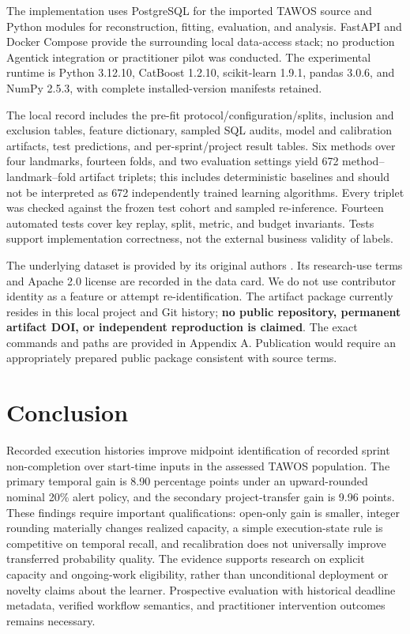 \documentclass[11pt,a4paper]{article}
\begin{document}
The implementation uses PostgreSQL for the imported TAWOS source and Python modules for reconstruction, fitting, evaluation, and analysis. FastAPI and Docker Compose provide the surrounding local data-access stack; no production Agentick integration or practitioner pilot was conducted. The experimental runtime is Python 3.12.10, CatBoost 1.2.10, scikit-learn 1.9.1, pandas 3.0.6, and NumPy 2.5.3, with complete installed-version manifests retained.

The local record includes the pre-fit protocol/configuration/splits, inclusion and exclusion tables, feature dictionary, sampled SQL audits, model and calibration artifacts, test predictions, and per-sprint/project result tables. Six methods over four landmarks, fourteen folds, and two evaluation settings yield 672 method--landmark--fold artifact triplets; this includes deterministic baselines and should not be interpreted as 672 independently trained learning algorithms. Every triplet was checked against the frozen test cohort and sampled re-inference. Fourteen automated tests cover key replay, split, metric, and budget invariants. Tests support implementation correctness, not the external business validity of labels.

The underlying dataset is provided by its original authors \cite{tawosi2022tawos,tawosv11}. Its research-use terms and Apache 2.0 license are recorded in the data card. We do not use contributor identity as a feature or attempt re-identification. The artifact package currently resides in this local project and Git history; \textbf{no public repository, permanent artifact DOI, or independent reproduction is claimed}. The exact commands and paths are provided in Appendix A. Publication would require an appropriately prepared public package consistent with source terms.

\section{Conclusion}\label{conclusion}

Recorded execution histories improve midpoint identification of recorded sprint non-completion over start-time inputs in the assessed TAWOS population. The primary temporal gain is 8.90 percentage points under an upward-rounded nominal 20\% alert policy, and the secondary project-transfer gain is 9.96 points. These findings require important qualifications: open-only gain is smaller, integer rounding materially changes realized capacity, a simple execution-state rule is competitive on temporal recall, and recalibration does not universally improve transferred probability quality. The evidence supports research on explicit capacity and ongoing-work eligibility, rather than unconditional deployment or novelty claims about the learner. Prospective evaluation with historical deadline metadata, verified workflow semantics, and practitioner intervention outcomes remains necessary.
\end{document}
